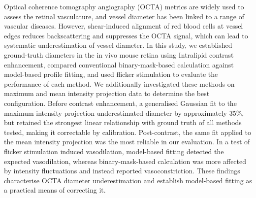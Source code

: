 
Optical coherence tomography angiography (OCTA) metrics are widely used to assess the retinal vasculature, and vessel diameter has been linked to a range of vascular diseases. However, shear-induced alignment of red blood cells at vessel edges reduces backscattering and suppresses the OCTA signal, which can lead to systematic underestimation of vessel diameter. In this study, we established ground-truth diameters in the in vivo mouse retina using Intralipid contrast enhancement, compared conventional binary-mask-based calculation against model-based profile fitting, and used flicker stimulation to evaluate the performance of each method. We additionally investigated these methods on maximum and mean intensity projection data to determine the best configuration. Before contrast enhancement, a generalised Gaussian fit to the maximum intensity projection underestimated diameter by approximately 35\%, but retained the strongest linear relationship with ground truth of all methods tested, making it correctable by calibration. Post-contrast, the same fit applied to the mean intensity projection was the most reliable in our evaluation. In a test of flicker stimulation induced vasodilation, model-based fitting detected the expected vasodilation, whereas binary-mask-based calculation was more affected by intensity fluctuations and instead reported vasoconstriction. These findings characterise OCTA diameter underestimation and establish model-based fitting as a practical means of correcting it.